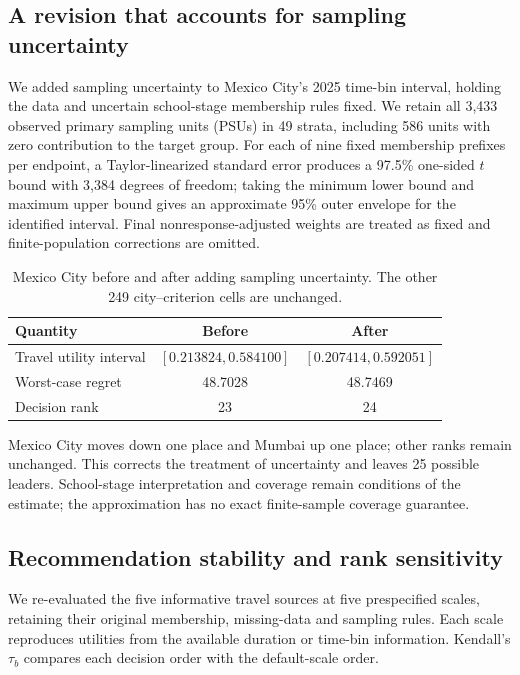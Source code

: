 \clearpage
\subsection{A revision that accounts for sampling uncertainty}
We added sampling uncertainty to Mexico City's 2025 time-bin interval,
holding the data and uncertain school-stage membership rules fixed. We retain
all 3,433 observed primary sampling units (PSUs) in 49 strata, including 586 units with
zero contribution to the target group. For each of nine fixed membership prefixes per endpoint, a Taylor-linearized
standard error produces a 97.5\% one-sided $t$ bound with 3,384 degrees of
freedom; taking
the minimum lower bound and maximum upper bound gives an approximate
95\% outer envelope for the identified interval. Final nonresponse-adjusted
weights are treated as fixed and finite-population corrections are omitted.

\begin{table}[htbp]
\centering
\caption{Mexico City before and after adding sampling uncertainty.
The other 249 city--criterion cells are unchanged.}
\label{tab:t4revision}
\begin{tabular}{lcc}
\toprule
Quantity & Before & After\\
\midrule
Travel utility interval & $[0.213824,0.584100]$ & $[0.207414,0.592051]$\\
Worst-case regret & 48.7028 & 48.7469\\
Decision rank & 23 & 24\\
\bottomrule
\end{tabular}
\end{table}

Mexico City moves down one place and Mumbai up one place; other ranks
remain unchanged. This corrects the treatment of uncertainty and leaves
25 possible leaders. School-stage interpretation and coverage remain
conditions of the estimate; the approximation has no exact finite-sample
coverage guarantee.

\subsection{Recommendation stability and rank sensitivity}
We re-evaluated the five informative travel sources at five prespecified
scales, retaining their original membership, missing-data and sampling rules.
Each scale reproduces utilities from the available duration or time-bin
information. Kendall's $\tau_b$ compares each decision order with the
default-scale order.

